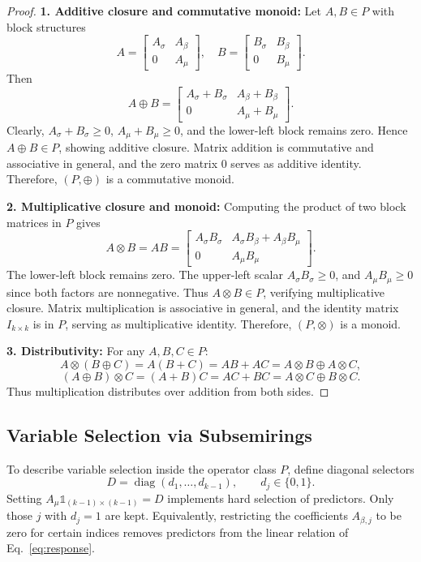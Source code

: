 \begin{proof}

\textbf{1. Additive closure and commutative monoid:}
Let $A, B \in P$ with block structures
\[
A = \begin{bmatrix} A_\sigma & A_\beta \\ 0 & A_\mu \end{bmatrix}, \quad
B = \begin{bmatrix} B_\sigma & B_\beta \\ 0 & B_\mu \end{bmatrix}.
\]
Then
\[
A \oplus B = \begin{bmatrix} A_\sigma + B_\sigma & A_\beta + B_\beta \\ 0 & A_\mu + B_\mu \end{bmatrix}.
\]
Clearly, $A_\sigma + B_\sigma \ge 0$, $A_\mu + B_\mu \ge 0$, and the lower-left block remains zero. Hence $A \oplus B \in P$, showing additive closure.  
Matrix addition is commutative and associative in general, and the zero matrix $0$ serves as additive identity. Therefore, $(P, \oplus)$ is a commutative monoid.

\textbf{2. Multiplicative closure and monoid:}
Computing the product of two block matrices in $P$ gives 
\[
A \otimes B = AB =
\begin{bmatrix} 
A_\sigma B_\sigma & A_\sigma B_\beta + A_\beta B_\mu \\ 
0 & A_\mu B_\mu
\end{bmatrix}.
\]
The lower-left block remains zero. The upper-left scalar $A_\sigma B_\sigma \ge 0$, and $A_\mu B_\mu \ge 0$ since both factors are nonnegative. Thus $A \otimes B \in P$, verifying multiplicative closure.  
Matrix multiplication is associative in general, and the identity matrix $I_{k \times k}$ is in $P$, serving as multiplicative identity. Therefore, $(P, \otimes)$ is a monoid.

\textbf{3. Distributivity:} For any $A,B,C \in P$:
\[
A \otimes (B \oplus C) = A(B+C) = AB + AC = A \otimes B \oplus A \otimes C,
\]
\[
(A \oplus B) \otimes C = (A+B)C = AC + BC = A \otimes C \oplus B \otimes C.
\]
Thus multiplication distributes over addition from both sides.
\end{proof}


\subsection{Variable Selection via Subsemirings}

To describe variable selection inside the operator class $P$, define diagonal selectors
\[
D = \operatorname{diag}(d_1,\dots,d_{k-1}),\qquad d_j\in\{0,1\}.
\]
Setting \(A_\mu \mathbb{1}_{(k-1)\times(k-1)}= D\) implements hard selection of predictors. Only those \(j\) with \(d_j=1\) are kept. Equivalently, restricting the coefficients \(A_{\beta,j}\) to be zero for certain indices removes predictors from the linear relation of Eq.~\eqref{eq:response}.

